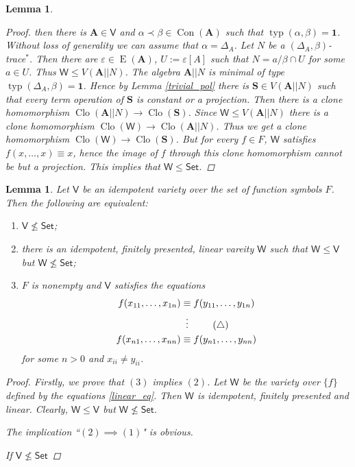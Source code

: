\documentclass{amsart}
\theoremstyle{plain}
\newtheorem{lemma}[theorem]{Lemma}
\theoremstyle{definition}
\theoremstyle{remark}
\def\epsilon{\varepsilon}
\DeclareMathOperator{\Clo}{Clo}
\DeclareMathOperator{\Con}{Con}
\DeclareMathOperator{\typ}{typ}
\DeclareMathOperator{\Id}{E}
\begin{document}
\begin{lemma}
\begin{proof}
        then there is $\mathbf{A} \in \mathsf{V}$ and $\alpha \prec \beta \in \Con(\mathbf{A})$ such that $\typ(\alpha, \beta) =\mathbf{1}$. 
        Without loss of generality we can assume that $\alpha = \Delta_A$. 
        Let $N$ be a $(\Delta_A, \beta)$-trace$^{*}$.
        Then there are $\epsilon \in \Id(\mathbf{A})$, $U:=\epsilon[A]$ such that $N = a /\beta \cap U$ for some $a \in U$. 
        Thus $\mathsf{W} \le V(\mathbf{A}||N)$. 
        The algebra $\mathbf{A}||N$ is minimal of type $\typ(\Delta_A,\beta)=\mathbf{1}$. 
        Hence by Lemma \ref{trivial_pol}
        there is $\mathbf{S} \in V(\mathbf{A}||N)$ such that every term operation of $\mathbf{S}$ is constant or a projection. 
        Then there is a clone homomorphism $\Clo(\mathbf{A}||N) \to \Clo(\mathbf{S})$.
        Since $\mathsf{W} \le V(\mathbf{A}||N)$ there is a clone homomorphism $\Clo(\mathsf{W}) \to \Clo(\mathbf{A}||N)$. 
        Thus we get a clone homomorphism $\Clo(\mathsf{W}) \to \Clo(\mathbf{S})$. 
        But for every $f \in F$, $\mathsf{W}$ satisfies $f(x, \ldots, x) \equiv x$, hence the image of $f$ through this clone homomorphism cannot be but a projection. 
        This implies that $\mathsf{W} \le \mathsf{Set}$. 
    \end{proof}
\end{lemma}

\begin{lemma}
    Let $\mathsf{V}$ be an idempotent variety over the set of function symbols $F$. 
    Then the following are equivalent: 
    \begin{enumerate}
        \item $\mathsf{V} \nleq \mathsf{Set}$; 
        \item there is an idempotent, finitely presented, linear vareity $\mathsf{W}$ such that $\mathsf{W} \le \mathsf{V}$ but $\mathsf{W} \nleq \mathsf{Set}$; 
        \item $F$ is nonempty and $\mathsf{V}$ satisfies the equations 
        \begin{align}
            \label{linear_eq}
            f(x_{11}, \ldots, x_{1n}) & \equiv f(y_{11}, \ldots, y_{1n}) \notag\\
            & \vdotswithin{\equiv} \tag{$\triangle$}  \\ 
            f(x_{n1}, \ldots, x_{nn}) & \equiv f(y_{n1}, \ldots, y_{nn}) \notag
        \end{align}
        for some $n >0$ and $x_{ii} \neq y_{ii}$. 
    \end{enumerate}
    \begin{proof}
        Firstly, we prove that $(3)$ implies $(2)$. 
        Let $\mathsf{W}$ be the variety over $\{f\}$ defined by the equations \eqref{linear_eq}. 
        Then $\mathsf{W}$ is idempotent, finitely presented and linear. 
        Clearly, $\mathsf{W} \le \mathsf{V}$ but $\mathsf{W} \nleq \mathsf{Set}$. 

        The implication ``$(2) \implies (1)$" is obvious. 

        If $\mathsf{V} \nleq \mathsf{Set}$
    \end{proof}
\end{lemma}
\end{document}
